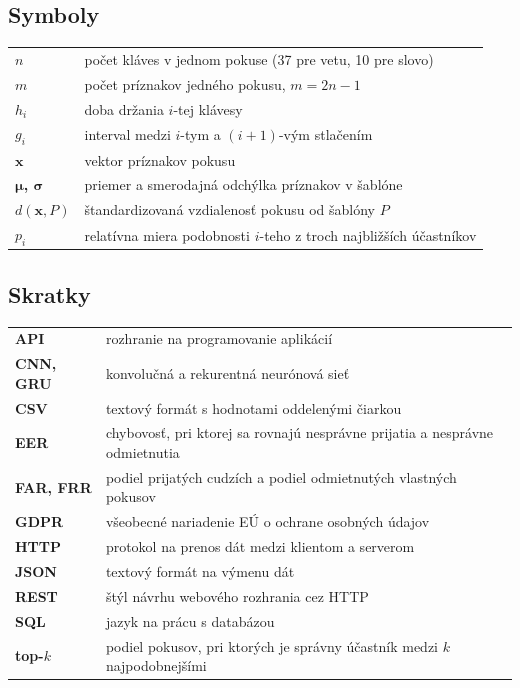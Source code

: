 \documentclass[11pt,a4paper]{article}
\newcommand{\sectionbreak}{\clearpage} %
\renewcommand{\arraystretch}{1.35}   %
\begin{document}
\begin{singlespace}
\small
\renewcommand{\arraystretch}{1.25}
\setlength{\parskip}{0pt}

\subsection*{Symboly}
\begin{tabularx}{\textwidth}{@{}>{\bfseries}p{3.2cm}Y@{}}
  \toprule
  $n$ & počet kláves v jednom pokuse (37 pre vetu, 10 pre slovo) \\
  $m$ & počet príznakov jedného pokusu, $m = 2n-1$ \\
  $h_i$ & doba držania $i$-tej klávesy \\
  $g_i$ & interval medzi $i$-tym a $(i+1)$-vým stlačením \\
  $\mathbf{x}$ & vektor príznakov pokusu \\
  $\boldsymbol{\mu}$, $\boldsymbol{\sigma}$ & priemer a smerodajná odchýlka príznakov v šablóne \\
  $d(\mathbf{x}, P)$ & štandardizovaná vzdialenosť pokusu od šablóny $P$ \\
  $p_i$ & relatívna miera podobnosti $i$-teho z troch najbližších účastníkov \\
  \bottomrule
\end{tabularx}

\subsection*{Skratky}
\begin{tabularx}{\textwidth}{@{}>{\bfseries}p{3.2cm}Y@{}}
  \toprule
  API & rozhranie na programovanie aplikácií \\
  CNN, GRU & konvolučná a rekurentná neurónová sieť \\
  CSV & textový formát s hodnotami oddelenými čiarkou \\
  EER & chybovosť, pri ktorej sa rovnajú nesprávne prijatia a nesprávne odmietnutia \\
  FAR, FRR & podiel prijatých cudzích a podiel odmietnutých vlastných pokusov \\
  GDPR & všeobecné nariadenie EÚ o ochrane osobných údajov \\
  HTTP & protokol na prenos dát medzi klientom a serverom \\
  JSON & textový formát na výmenu dát \\
  REST & štýl návrhu webového rozhrania cez HTTP \\
  SQL & jazyk na prácu s databázou \\
  top-$k$ & podiel pokusov, pri ktorých je správny účastník medzi $k$ najpodobnejšími \\
  \bottomrule
\end{tabularx}
\end{singlespace}
\end{document}
